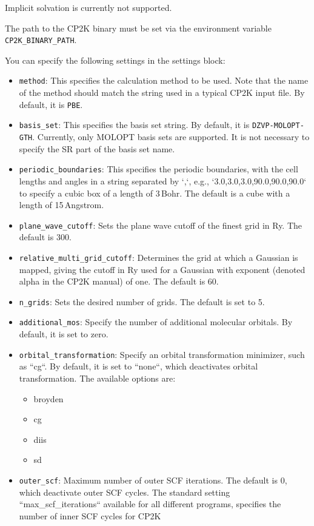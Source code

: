 \documentclass[]{tufte-book}
\begin{document}
Implicit solvation is currently not supported.

The path to the \textsc{CP2K} binary must be set via the environment variable \texttt{CP2K\_BINARY\_PATH}.

You can specify the following settings in the settings block:
\begin{itemize}
	\item \texttt{method}: This specifies the calculation method to be used.
	Note that the name of the method should match the string used in a typical \textsc{CP2K} input file.
	By default, it is \texttt{PBE}.
	\item \texttt{basis\_set}: This specifies the basis set string. By default, it is \texttt{DZVP-MOLOPT-GTH}. Currently, only MOLOPT basis sets are supported. It is not necessary to specify the SR part of the basis set name.
	\item \texttt{periodic\_boundaries}: This specifies the periodic boundaries, with the cell lengths and angles in a string separated by `,`, e.g., `3.0,3.0,3.0,90.0,90.0,90.0` to specify a cubic box of a length of 3\,Bohr. The default is a cube with a length of 15\,Angstrom.
	\item \texttt{plane\_wave\_cutoff}: Sets the plane wave cutoff of the finest grid in Ry. The default is 300.
	\item \texttt{relative\_multi\_grid\_cutoff}: Determines the grid at which a Gaussian is mapped, giving the cutoff in Ry used for a Gaussian with exponent (denoted alpha in the \textsc{CP2K} manual) of one. The default is 60.
	\item \texttt{n\_grids}: Sets the desired number of grids. The default is set to 5.
	\item \texttt{additional\_mos}: Specify the number of additional molecular orbitals. By default, it is set to zero.
	\item \texttt{orbital\_transformation}: Specify an orbital transformation minimizer, such as ``cg``. By default, it is set to ``none``, which deactivates orbital transformation. The available options are:
        \begin{itemize}
		\item broyden
		\item cg
		\item diis
		\item sd
        \end{itemize}
	\item \texttt{outer\_scf}: Maximum number of outer SCF iterations. The default is 0, which deactivate outer SCF cycles. The standard setting ``max\_scf\_iterations`` available for all different programs, specifies the number of inner SCF cycles for \textsc{CP2K}

\end{itemize}
\end{document}
